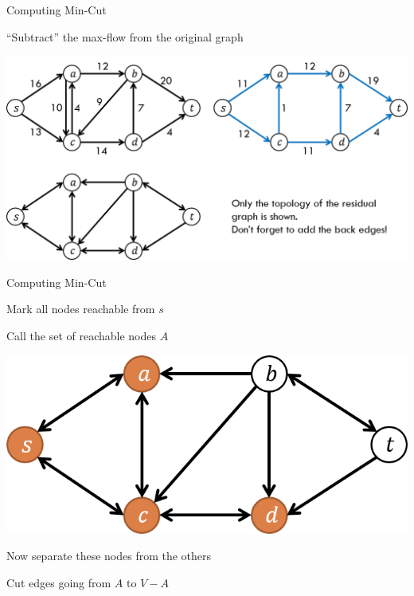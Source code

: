 \documentclass[13pt,onlymath]{beamer}
\begin{document}
\begin{frame}{Computing Min-Cut}
\BIT
\item ``Subtract'' the max-flow from the original graph
\EIT
\begin{center}
\includegraphics[height=0.6\textheight]{figures/mincut_computation1}
\end{center}
\end{frame}

\begin{frame}{Computing Min-Cut}
\BIT
\item Mark all nodes reachable from $s$
\BIT
\item Call the set of reachable nodes $A$
\EIT
\begin{center}
\includegraphics[height=0.3\textheight]{figures/mincut_computation2}
\end{center}
\vfill
\item Now separate these nodes from the others
\BIT
\item Cut edges going from $A$ to $V-A$
\EIT \EIT
\end{frame}
\end{document}
